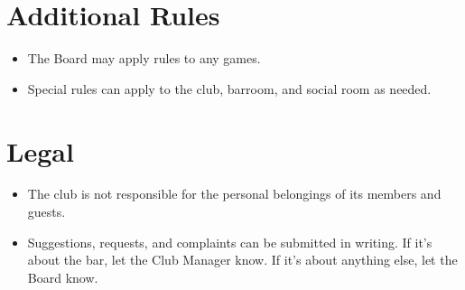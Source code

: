 \documentclass[12pt,letterpaper]{article}
\begin{document}
\section*{Additional Rules}
\begin{itemize}
\item The Board may apply rules to any games.
\item Special rules can apply to the club, barroom, and social room as needed.
\end{itemize}

\section*{Legal}
\begin{itemize}
\item The club is not responsible for the personal belongings of its members and guests.
\item Suggestions, requests, and complaints can be submitted in writing.  If it's about the bar, let the Club Manager know.  If it's about anything else, let the Board know.
\end{itemize}
\end{document}
